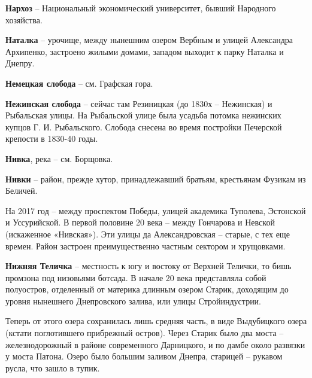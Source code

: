 


\textbf{Нархоз} – Национальный экономический университет, бывший Народного хозяйства.\\


\medskip


\textbf{Наталка} – урочище, между нынешним озером Вербным и улицей Александра Архипенко, застроено жилыми домами, западом выходит к парку Наталка и Днепру.\\



\medskip

\textbf{Немецкая слобода} – см. Графская гора.\\


\medskip


\textbf{Нежинская слобода} – сейчас там Резиницкая (до 1830х – Нежинская) и Рыбальская улицы. На Рыбальской улице была усадьба потомка нежинских купцов Г. И. Рыбальского. Слобода снесена во время постройки Печерской крепости в 1830-40 годы.\\ 

\medskip

\textbf{Нивка}, река – см. Борщовка.\\


\medskip

\textbf{Нивки} – район, прежде хутор, принадлежавший братьям, крестьянам Фузикам из Беличей. 

На 2017 год – между проспектом Победы, улицей академика Туполева, Эстонской и Уссурийской. В первой половине 20 века – между Гончарова и Невской (искаженное «Нивская»). Эти улицы да Александровская – старые, с тех еще времен. Район застроен преимущественно частным сектором и хрущовками.\\


\medskip


\textbf{Нижняя Теличка} – местность к югу и востоку от Верхней Телички, то бишь промзона под низовьями ботсада. В начале 20 века представляла собой полуостров, отделенный от материка длинным озером Старик, доходящим до уровня нынешнего Днепровского залива, или улицы Стройиндустрии. 

Теперь от этого озера сохранилась лишь средняя часть, в виде Выдубицкого озера (кстати поглотившего прибрежный остров). Через Старик было два моста – железнодорожный в районе современного Дарницкого, и по дамбе около развязки у моста Патона. Озеро было большим заливом Днепра, старицей – рукавом русла, что зашло в тупик.\\


